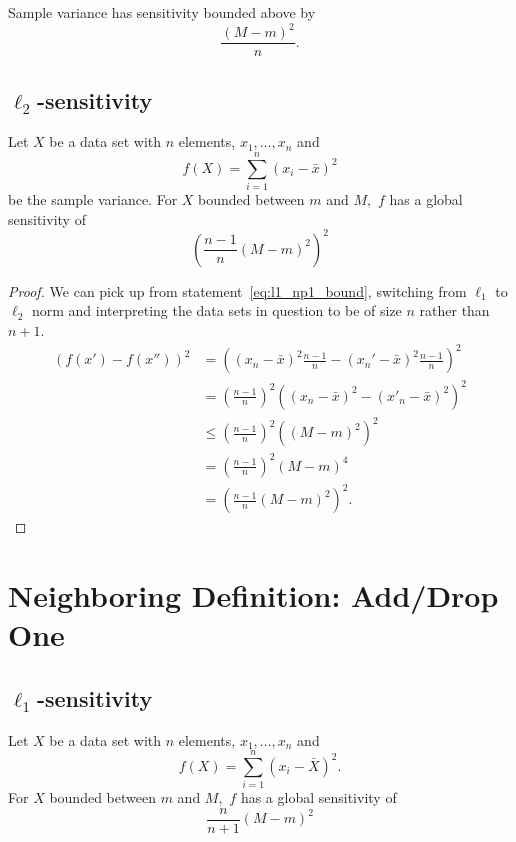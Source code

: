 \documentclass[11pt]{scrartcl} %
\begin{document}
\begin{corollary}
Sample variance has sensitivity bounded above by
$$ \frac{(M-m)^2 }{n}. $$
\end{corollary}

\subsection{$\ell_2$-sensitivity}
\begin{theorem}
	Let $X$ be a data set with $n$ elements, $x_1, \hdots, x_n$ and
	\[ f(X) = \sum_{i=1}^n (x_i - \bar{x})^2 \]
	be the sample variance.
	For $X$ bounded between $m$ and $M,$ $f$ has a global sensitivity of
	\[ \left( \frac{n-1}{n} (M-m)^2 \right)^2 \]
\end{theorem}

\begin{proof}
	We can pick up from statement~\ref{eq:l1_np1_bound}, switching from $\ell_1$ to $\ell_2$ norm and interpreting
	the data sets in question to be of size $n$ rather than $n+1$.
	\begin{align*}
		(f(x') - f(x''))^2
			&= \left( (x_{n}-\bar{x})^2 \frac{n-1}{n} - (x_{n}'-\bar{x})^2 \frac{n-1}{n} \right)^2 \\
			&= \left( \frac{n-1}{n} \right)^2 \left( (x_n - \bar{x})^2 - (x'_n - \bar{x})^2 \right)^2 \\
			&\leq \left( \frac{n-1}{n} \right)^2 \left( (M-m)^2 \right)^2 \\
			&= \left( \frac{n-1}{n} \right)^2 (M - m)^4 \\
			&= \left( \frac{n-1}{n} (M - m)^2 \right)^2.
	\end{align*}
\end{proof}

\section{Neighboring Definition: Add/Drop One}
\subsection{$\ell_1$-sensitivity}
 \begin{theorem}
 \label{thm:l1addsub}
 	Let $X$ be a data set with $n$ elements, $x_1, \hdots, x_n$ and
 	\[ f(X) = \sum_{i=1}^n (x_i - \bar{X})^2. \]
 	For $X$ bounded between $m$ and $M,$ $f$ has a global sensitivity of
 	\[ \frac{n}{n+1} (M-m)^2 \]
 \end{theorem}
\end{document}

